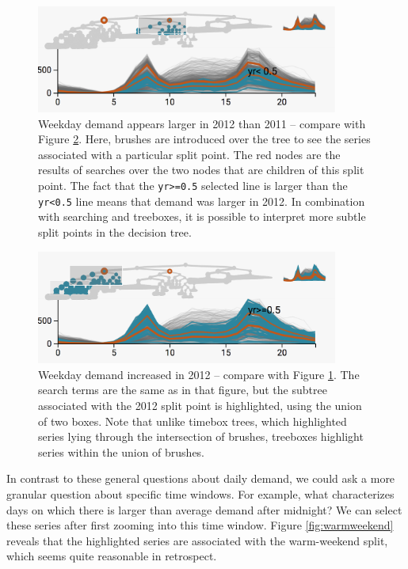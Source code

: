 \begin{figure}
  \centering
  \includegraphics[width=375px]{figure/treelapse/weekday_2011}
    \caption{Weekday demand appears larger in 2012 than 2011 -- compare with Figure 
      \ref{fig:weekday2012}. Here, brushes are introduced over the tree to see the
      series associated with a particular split point. The red nodes are the results
      of searches over the two nodes that are children of this split point. The fact
      that the \texttt{yr>=0.5} selected line is larger than the \texttt{yr<0.5}
      line means that demand was larger in 2012. In combination with searching and
      treeboxes, it is possible to interpret more subtle split points in the decision
      tree.} \label{fig:weekday2011}
\end{figure}

\begin{figure}
  \centering
  \includegraphics[width=375px]{figure/treelapse/weekday_2012}
  \caption{Weekday demand increased in 2012 -- compare with 
    Figure \ref{fig:weekday2011}. The search terms are the same as in that figure,
    but the subtree associated with the 2012 split point is highlighted, using the
    union of two boxes. Note that unlike timebox trees, which highlighted series
    lying through the intersection of brushes, treeboxes highlight series within the
    union of brushes.}\label{fig:weekday2012}
\end{figure}

In contrast to these general questions about daily demand, we could ask
a more granular question about specific time windows. For example, what
characterizes days on which there is larger than average demand after
midnight? We can select these series after first zooming into this time window.
Figure \ref{fig:warmweekend} reveals that the highlighted series are associated
with the warm-weekend split, which seems quite reasonable in retrospect.

